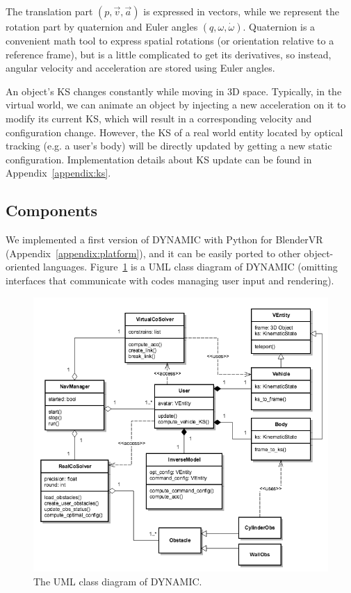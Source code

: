 The translation part $(p,\overrightarrow{v},\overrightarrow{a})$ is expressed in vectors, while we represent the rotation part by quaternion and Euler angles $(q,\omega,\dot{\omega})$. Quaternion is a convenient math tool to express spatial rotations (or orientation relative to a reference frame), but is a little complicated to get its derivatives, so instead, angular velocity and acceleration are stored using Euler angles.

An object's KS changes constantly while moving in 3D space. Typically, in the virtual world, we can animate an object by injecting a new acceleration on it to modify its current KS, which will result in a corresponding velocity and configuration change. However, the KS of a real world entity located by optical tracking (e.g. a user's body) will be directly updated by getting a new static configuration. Implementation details about KS update can be found in Appendix~\ref{appendix:ks}. 


\subsection{Components}
We implemented a first version of DYNAMIC with Python for BlenderVR (Appendix~\ref{appendix:platform}), and it can be easily ported to other object-oriented languages. Figure~\ref{fig:5_uml} is a UML class diagram of DYNAMIC (omitting interfaces that communicate with codes managing user input and rendering).

\begin{figure}[htb]
  \centering
  \includegraphics[width=.9\textwidth]{figures/ch5/uml}
  \caption{\label{fig:5_uml}The UML class diagram of DYNAMIC.}
\end{figure}


